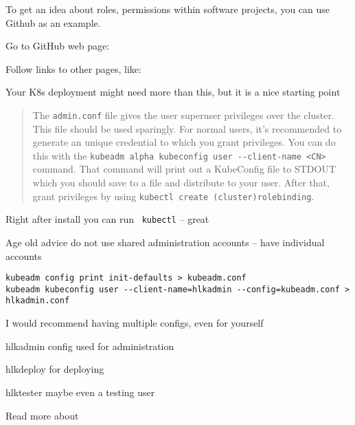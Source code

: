 \documentclass[Screen16to9,17pt]{foils}
\begin{document}

To get an idea about roles, permissions within software projects, you can use Github as an example.

\begin{list2}
\item
Go to GitHub web page:\\
\item Follow links to other pages, like:\\
\item Your K8s deployment might need more than this, but it is a nice starting point
\end{list2}




\begin{quote}
The \verb+admin.conf+ file gives the user superuser privileges over the cluster. This file should be used sparingly. For normal users, it's recommended to generate an unique credential to which you grant privileges. You can do this with the \verb+kubeadm alpha kubeconfig user --client-name <CN>+ command. That command will print out a KubeConfig file to STDOUT which you should save to a file and distribute to your user. After that, grant privileges by using \verb+kubectl create (cluster)rolebinding+.
\end{quote}

\begin{list2}
\item Right after install you can run \faWrench\ \verb+kubectl+ -- great
\item Age old advice do not use shared administration accounts -- have individual accounts
\end{list2}



\begin{verbatim}
kubeadm config print init-defaults > kubeadm.conf
kubeadm kubeconfig user --client-name=hlkadmin --config=kubeadm.conf > hlkadmin.conf
\end{verbatim}

\begin{list2}
\item I would recommend having multiple configs, even for yourself
\item hlkadmin config used for administration
\item hlkdeploy for deploying
\item hlktester maybe even a testing user
\item Read more about 
\end{list2}
\end{document}
